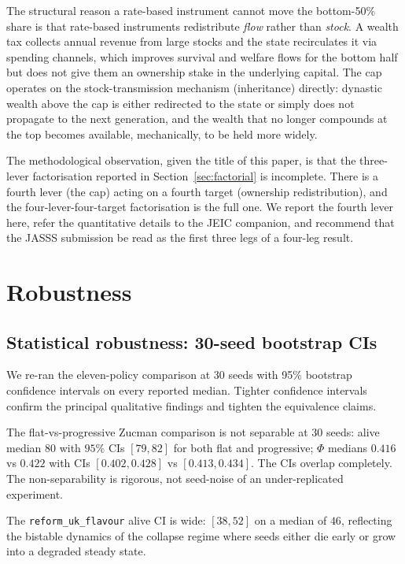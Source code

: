 \documentclass[11pt]{article}
\begin{document}
The structural reason a rate-based instrument cannot move the
bottom-50\% share is that rate-based instruments redistribute
\emph{flow} rather than \emph{stock}.  A wealth tax collects
annual revenue from large stocks and the state recirculates it
via spending channels, which improves survival and welfare flows
for the bottom half but does not give them an ownership stake in
the underlying capital.  The cap operates on the stock-transmission
mechanism (inheritance) directly: dynastic wealth above the cap is
either redirected to the state or simply does not propagate to the
next generation, and the wealth that no longer compounds at the
top becomes available, mechanically, to be held more widely.

The methodological observation, given the title of this paper, is
that the three-lever factorisation reported in
Section~\ref{sec:factorial} is incomplete.  There is a fourth
lever (the cap) acting on a fourth target (ownership
redistribution), and the four-lever-four-target factorisation is
the full one.  We report the fourth lever here, refer the
quantitative details to the JEIC companion, and recommend that the
JASSS submission be read as the first three legs of a four-leg
result.

\section{Robustness}
\label{sec:robustness}

\subsection{Statistical robustness: 30-seed bootstrap CIs}

We re-ran the eleven-policy comparison at 30 seeds with 95\%
bootstrap confidence intervals on every reported median.  Tighter
confidence intervals confirm the principal qualitative findings
and tighten the equivalence claims.

The flat-vs-progressive Zucman comparison is not separable at 30
seeds: alive median $80$ with $95\%$ CIs $[79, 82]$ for both flat
and progressive; $\Phi$ medians $0.416$ vs $0.422$ with CIs
$[0.402, 0.428]$ vs $[0.413, 0.434]$.  The CIs overlap completely.
The non-separability is rigorous, not seed-noise of an
under-replicated experiment.

The \texttt{reform\_uk\_flavour} alive CI is wide: $[38, 52]$ on a
median of $46$, reflecting the bistable dynamics of the collapse
regime where seeds either die early or grow into a degraded
steady state.
\end{document}
